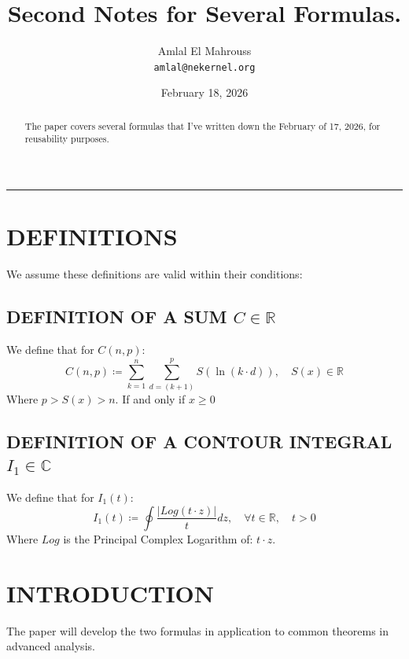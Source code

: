 \documentclass[11pt, a4paper]{article}
\title{Second Notes for Several Formulas.}
\author{Amlal El Mahrouss\\\texttt{amlal@nekernel.org}}
\date{February 18, 2026}
\begin{document}
\maketitle

\begin{center}
	\rule[0.01cm]{17cm}{0.01cm}
\end{center}

\begin{abstract}
\begin{center}
    The paper covers several formulas that I've written down the February of 17, 2026, for reusability purposes.
\end{center}
\end{abstract}

\section{DEFINITIONS}

We assume these definitions are valid within their conditions:

\subsection{DEFINITION OF A SUM $C \in \mathbb{R}$}
We define that for $C(n, p)$:
\begin{equation}
C(n, p) \coloneq \sum_{k=1}^{n} \sum_{d=(k+1)}^{p} S(\ln (k \cdot d)), \quad S(x) \in \mathbb{R}
\end{equation}
Where $p > S(x) > n$. If and only if $x \geq 0$ 

\subsection{DEFINITION OF A CONTOUR INTEGRAL $I_{1} \in \mathbb{C}$}
We define that for $I_{1}(t)$:
\begin{equation}
I_{1}(t) \coloneq \oint \frac{|Log(t\cdot z)|}{t}dz, \quad \forall t \in \mathbb{R}, \quad t > 0
\end{equation}
Where $Log$ is the Principal Complex Logarithm of: $t \cdot z$.

\section{INTRODUCTION}

The paper will develop the two formulas in application to common theorems in advanced analysis.
\end{document}
